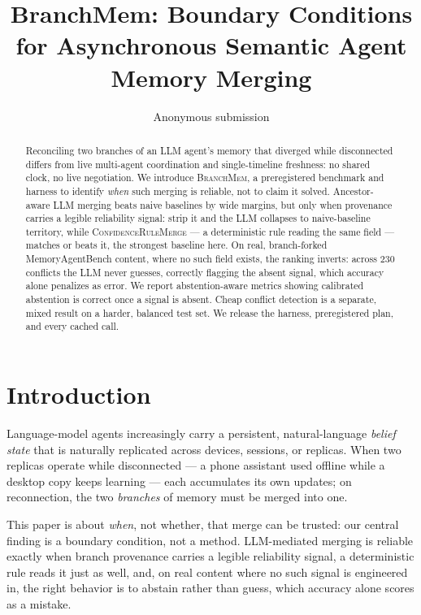 \documentclass[11pt]{article}
\title{BranchMem: Boundary Conditions for Asynchronous Semantic Agent Memory Merging}
\author{Anonymous submission}
\begin{document}
\maketitle

\begin{abstract}
Reconciling two branches of an LLM agent's memory that diverged while
disconnected differs from live multi-agent coordination and
single-timeline freshness: no shared clock, no live negotiation. We
introduce \textsc{BranchMem}, a preregistered benchmark and harness to
identify \emph{when} such merging is reliable, not to claim it solved.
Ancestor-aware LLM merging beats naive baselines by wide margins, but only
when provenance carries a legible reliability signal: strip it and the LLM
collapses to naive-baseline territory, while \textsc{ConfidenceRuleMerge}
--- a deterministic rule reading the same field --- matches or beats it,
the strongest baseline here. On real, branch-forked MemoryAgentBench
content, where no such field exists, the ranking inverts: across $230$
conflicts the LLM never guesses, correctly flagging the absent signal,
which accuracy alone penalizes as error. We report abstention-aware
metrics showing calibrated abstention is correct once a signal is absent.
Cheap conflict detection is a separate, mixed result on a harder, balanced
test set. We release the harness, preregistered plan, and every cached
call.
\end{abstract}

\section{Introduction}
\label{sec:intro}

Language-model agents increasingly carry a persistent, natural-language
\emph{belief state} that is naturally replicated across devices, sessions,
or replicas. When two replicas operate while disconnected --- a phone
assistant used offline while a desktop copy keeps learning --- each
accumulates its own updates; on reconnection, the two \emph{branches} of
memory must be merged into one.

This paper is about \emph{when}, not whether, that merge can be trusted:
our central finding is a boundary condition, not a method. LLM-mediated
merging is reliable exactly when branch provenance carries a legible
reliability signal, a deterministic rule reads it just as well, and, on
real content where no such signal is engineered in, the right behavior is
to abstain rather than guess, which accuracy alone scores as a mistake.
\end{document}
